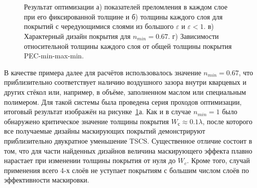\begin{figure}[p]
  \begin{minipage}{\linewidth}
  \begin{minipage}{0.49\linewidth}
  \end{minipage}
  \hfill
  \begin{minipage}{0.49\linewidth}
  \end{minipage}
  \end{minipage}\\
  \vspace*{4ex}%
  \\
  \begin{minipage}{\linewidth}
  \begin{minipage}{0.49\linewidth}
  \end{minipage}
  \hfill
  \begin{minipage}{0.49\linewidth}
  \end{minipage}
  \end{minipage}
  \caption{Результат оптимизации а) показателей преломления в каждом
    слое при его фиксированной толщине и б) толщины каждого слоя для
    покрытий с чередующимися слоями из большого $\varepsilon$ и
    ${\varepsilon<1}$. в) Характерный дизайн покрытия для
    $n_{min} = 0.67$. г) Зависимости относительной толщины каждого
    слоя от общей толщины покрытия PEC-min-max-min. }
  \label{img:min-max-min}  
\end{figure}

В качестве примера далее для расчётов использовалось значение
$n_{min}=0.67$, что приблизительно соответствует наличию воздушного
зазора внутри кварцевых и других стёкол или, например, в объёме,
заполненном маслом или специальным полимером.  Для такой системы была
проведена серия проходов оптимизации, итоговый результат изображён на
рисунке~\ref{img:min-max-min}а. Как и в случае $n_{min}=1$ было
обнаружено критическое значение толщины покрытия
$W_с\approx 0.1\lambda$, после которого все получаемые дизайны
маскирующих покрытий демонстрируют приблизительно двукратное
уменьшение TSCS. Существенное отличие состоит в том, что для части
найденных дизайнов величина маскирующего эффекта плавно нарастает при
изменении толщины покрытия от нуля до $W_c$. Кроме того, случай применения
всего 4-х слоёв не уступает покрытиям с большим числом слоёв по
эффективности маскировки.

